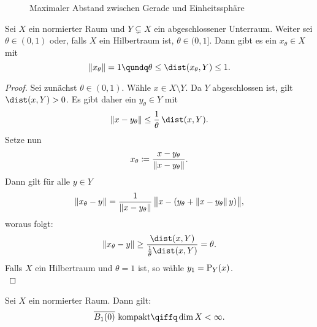 \begin{thSatz} \label{vl16:fastorthogonaleselem}
    \begin{figure}[b] %
        \centering
        \caption{Maximaler Abstand zwischen Gerade und Einheitssphäre}
        \label{fig:<+label+>}
    \end{figure}
    Sei $X$ ein normierter Raum und $Y\subsetneq X$ ein abgeschlossener Unterraum.
    Weiter sei $\theta\in(0,1)$ oder, falls $X$ ein Hilbertraum ist,
    $\theta\in(0,1]$. Dann gibt es ein $x_\theta\in X$ mit
    \[ \norm{x_\theta} = 1 \qundq \theta\leq\dist(x_\theta,Y)\leq 1   . \]
\end{thSatz}

\begin{proof}
    Sei zunächst $\theta\in(0,1)$.
    Wähle $x\in X\setminus Y$. Da $Y$ abgeschlossen ist, gilt $\dist(x,Y)>0$. Es
    gibt daher ein $y_\theta\in Y$ mit
    \[ \norm{x-y_\theta} \leq \frac{1}{\theta} \, \dist(x,Y)  . \]
    Setze nun
    \[ x_\theta \defeq \frac{x-y_\theta}{\norm{x-y_\theta}}  . \]
    Dann gilt für alle $y\in Y$
    \[ \norm{x_\theta-y} = \frac{1}{\norm{x-y_\theta}} \,
        \norm[\big]{x-(y_\theta+\norm{x-y_\theta}\,y)}
    , \]
    woraus folgt:
    \[ \norm{x_\theta-y} 
        \geq \frac{\dist(x,Y)}{\frac{1}{\theta}\dist(x,Y)} =
        \theta
    . \]
    Falls $X$ ein Hilbertraum und $\theta=1$ ist, so wähle $y_1=\Proj_Y(x)$.
    \\
\end{proof}

\begin{thSatz} \label{vl16:heineborel}
    Sei $X$ ein normierter Raum. Dann gilt:
    \[ \setclosure{B_1(0)} \text{ kompakt} \qiffq \dim X < \infty  . \]
\end{thSatz}

